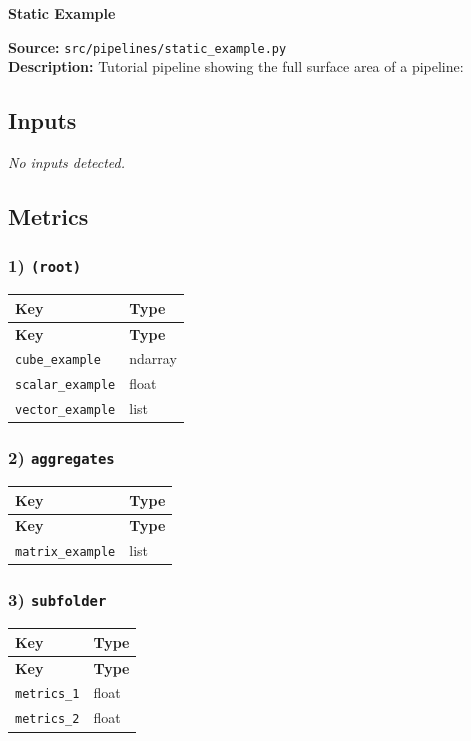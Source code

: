 \documentclass[11pt]{article}
\begin{document}
\begin{center}
\LARGE\textbf{Static Example}
\end{center}
\textbf{Source:} \texttt{src/\allowbreak{}pipelines/\allowbreak{}static\_\allowbreak{}example.py}\\
\textbf{Description:} Tutorial pipeline showing the full surface area of a pipeline:

\subsection*{Inputs}
\emph{No inputs detected.}

\subsection*{Metrics}
\subsubsection*{1) \texttt{(root)}}
\begin{longtable}{|p{}|p{}|}
\hline
\textbf{Key} & \textbf{Type} \\ \hline
\endfirsthead
\hline
\textbf{Key} & \textbf{Type} \\ \hline
\endhead
\texttt{cube\_\allowbreak{}example} & ndarray \\ \hline
\texttt{scalar\_\allowbreak{}example} & float \\ \hline
\texttt{vector\_\allowbreak{}example} & list \\ \hline
\end{longtable}

\subsubsection*{2) \texttt{aggregates}}
\begin{longtable}{|p{}|p{}|}
\hline
\textbf{Key} & \textbf{Type} \\ \hline
\endfirsthead
\hline
\textbf{Key} & \textbf{Type} \\ \hline
\endhead
\texttt{matrix\_\allowbreak{}example} & list \\ \hline
\end{longtable}

\subsubsection*{3) \texttt{subfolder}}
\begin{longtable}{|p{}|p{}|}
\hline
\textbf{Key} & \textbf{Type} \\ \hline
\endfirsthead
\hline
\textbf{Key} & \textbf{Type} \\ \hline
\endhead
\texttt{metrics\_\allowbreak{}1} & float \\ \hline
\texttt{metrics\_\allowbreak{}2} & float \\ \hline
\end{longtable}
\end{document}
